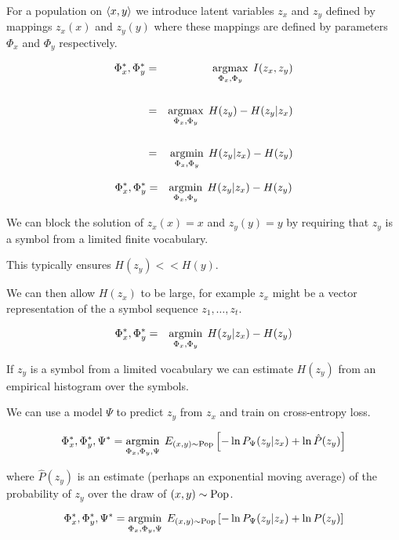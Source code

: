 {For a population on ${\mbox{$\langle x,y\rangle$}}$ we introduce latent variables $z_x$ and $z_y$ defined by
mappings $z_x(x)$ and $z_y(y)$ where these mappings are defined by parameters $\Phi_x$ and $\Phi_y$ respectively.

\begin{eqnarray*}
\Phi_x^*,\Phi_y^* & = & \operatorname*{argmax}_{\Phi_x,\Phi_y} \; I(z_x,z_y) \\
\\
&= & \operatorname*{argmax}_{\Phi_x,\Phi_y}\; H(z_y) - H(z_y|z_x) \\
\\
&= & \operatorname*{argmin}_{\Phi_x,\Phi_y}\; H(z_y|z_x) - H(z_y)
\end{eqnarray*}


\begin{eqnarray*}
\Phi_x^*,\Phi_y^* & = &  \operatorname*{argmin}_{\Phi_x,\Phi_y}\; H(z_y|z_x) - H(z_y)
\end{eqnarray*}

\vfill
We can block the solution of $z_x(x) = x$ and $z_y(y) = y$ by requiring that $z_y$ is a symbol from a limited finite vocabulary.

\vfill
This typically ensures $H(z_y) << H(y)$.

\vfill
We can then allow $H(z_x)$ to be large, for example $z_x$ might be a vector
representation of the a symbol sequence $z_1,\ldots,z_t$.


\begin{eqnarray*}
\Phi_x^*,\Phi_y^* & = &  \operatorname*{argmin}_{\Phi_x,\Phi_y}\; H(z_y|z_x) - H(z_y)
\end{eqnarray*}

\vfill
If $z_y$ is a symbol from a limited vocabulary we can estimate $H(z_y)$ from an empirical histogram over the symbols.

\vfill
We can use a model $\Psi$ to predict $z_y$ from $z_x$ and train on cross-entropy loss.


$$\Phi_x^*,\Phi_y^*,\Psi^* = \operatorname*{argmin}_{\Phi_x,\Phi_y,\Psi} \; E_{(x,y)\sim \mathrm{Pop}}\left[-\ln P_\Psi(z_y|z_x) + \ln \hat{P}(z_y)\right]$$

\vfill
where $\hat{P}(z_y)$ is an estimate (perhaps an exponential moving average) of the probability of $z_y$ over the draw of $(x,y) \sim \mathrm{Pop}$.


$$\Phi_x^*,\Phi_y^*,\Psi^* = \operatorname*{argmin}_{\Phi_x,\Phi_y,\Psi} \; E_{(x,y)\sim \mathrm{Pop}}\left[-\ln P_\Psi(z_y|z_x) + \ln P(z_y)\right]$$

}
